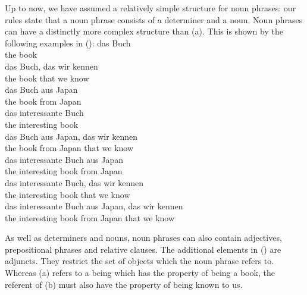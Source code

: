 Up to now, we have assumed a relatively simple structure for noun phrases: our rules state that a noun phrase consists of a determiner and a
noun. Noun phrases can have a distinctly more complex structure than (a). This is shown by the following examples in ():
\eal
\label{Beispiele-NP-Adjunkte}
\ex 
\gll das Buch\\
     the   book\\
\ex 
\gll das Buch, das  wir kennen\\
     the book  that we  know\\
\ex 
\gll das Buch aus  Japan\\
     the book from Japan\\
\ex 
\gll das interessante Buch\\
     the interesting   book\\
\ex 
\gll das Buch aus  Japan, das  wir kennen\\
     the book from Japan  that we  know\\
\ex 
\gll das interessante Buch aus  Japan\\
     the interesting  book from Japan\\
\ex 
\gll das interessante Buch, das  wir kennen\\
     the interesting  book  that we  know\\
\ex 
\gll das interessante Buch aus  Japan, das  wir kennen\\
     the interesting  book from Japan  that we  know\\
\zl

\noindent
As well as determiners and nouns, noun phrases can also contain adjectives, prepositional phrases and relative clauses. 
The additional elements in () are adjuncts. They restrict the set of objects which the noun phrase 
refers to. Whereas (a) refers to a being which has the property of being a book, the referent of (b) must
also have the property of being known to us.

